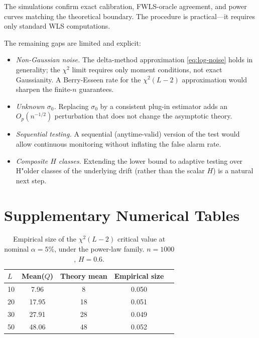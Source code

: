 \documentclass[10pt,a4paper,twocolumn]{article}
\begin{document}
The simulations confirm exact calibration, FWLS-oracle agreement, and power
curves matching the theoretical boundary.  The procedure is practical---it
requires only standard WLS computations.

The remaining gaps are limited and explicit:
\begin{itemize}[leftmargin=*]
    \item \emph{Non-Gaussian noise.}  The delta-method approximation
    \eqref{eq:log-noise} holds in generality; the $\chi^2$ limit requires
    only moment conditions, not exact Gaussianity.  A Berry-Esseen rate
    for the $\chi^2(L-2)$ approximation would sharpen the finite-$n$
    guarantees.
    \item \emph{Unknown $\sigma_0$.}  Replacing $\sigma_0$ by a
    consistent plug-in estimator adds an $O_p(n^{-1/2})$ perturbation
    that does not change the asymptotic theory.
    \item \emph{Sequential testing.}  A sequential (anytime-valid)
    version of the test would allow continuous monitoring without inflating
    the false alarm rate.
    \item \emph{Composite $H$ classes.}  Extending the lower bound to
    adaptive testing over H"older classes of the underlying drift (rather
    than the scalar $H$) is a natural next step.
\end{itemize}

\appendix

\section{Supplementary Numerical Tables}
\label{app:numerical_tables}

\begin{table}[h]
\centering
\small
\caption{Empirical size of the $\chi^2(L-2)$ critical value at nominal
$\alpha = 5\%$, under the power-law family.  $n=1000$, $H=0.6$.}
\label{tab:null}
\begin{tabular}{lcccc}
\toprule
$L$ & Mean($Q$) & Theory mean & Empirical size \\
\midrule
10  & 7.96  & 8  & 0.050 \\
20  & 17.95 & 18 & 0.051 \\
30  & 27.91 & 28 & 0.049 \\
50  & 48.06 & 48 & 0.052 \\
\bottomrule
\end{tabular}
\end{table}
\end{document}
